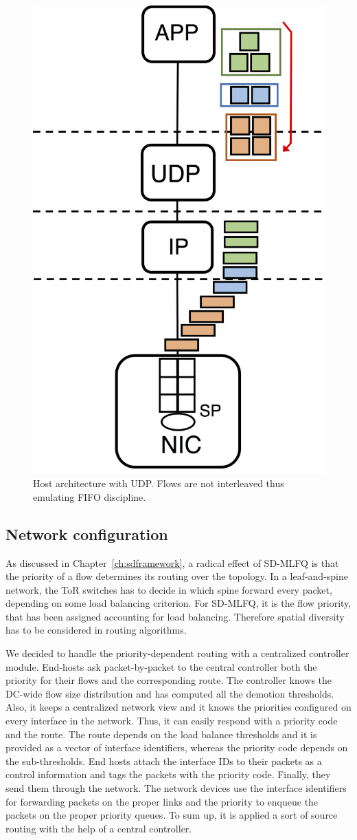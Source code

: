 \begin{figure}[!tb]
	\centering
	\captionsetup{width=.75\linewidth}
	\includegraphics[width=0.3\linewidth]{Chapter4/Figures/udp-config}
	\caption{Host architecture with UDP. Flows are not interleaved thus emulating FIFO discipline.}
	\label{fig:udp-config}
\end{figure}%
\subsection{Network configuration}
As discussed in Chapter~\ref{ch:sdframework}, a radical effect of SD-MLFQ is that the priority of a flow determines its routing over the topology. In a leaf-and-spine network, the ToR switches has to decide in which spine forward every packet, depending on some load balancing criterion. For SD-MLFQ, it is the flow priority, that has been assigned accounting for load balancing. Therefore spatial diversity has to be considered in routing algorithms.

We decided to handle the priority-dependent routing with a centralized controller module. End-hosts ask packet-by-packet to the central controller both the priority for their flows and the corresponding route. The controller knows the DC-wide flow size distribution and has computed all the demotion thresholds. Also, it keeps a centralized network view and it knows the priorities configured on every interface in the network. Thus, it can easily respond with a priority code and the route. The route depends on the load balance thresholds and it is provided as a vector of interface identifiers, whereas the priority code depends on the sub-thresholds. End hosts attach the interface IDs to their packets as a control information and tags the packets with the priority code. Finally, they send them through the network. The network devices use the interface identifiers for forwarding packets on the proper links and the priority to enqueue the packets on the proper priority queues. To sum up, it is applied a sort of source routing with the help of a central controller.

